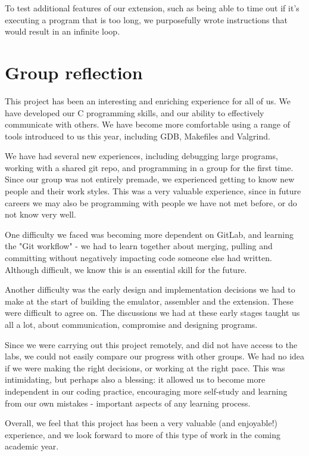 \documentclass[11pt]{article}
\begin{document}
To test additional features of our extension, such as being able to time out if it's executing a program that is too long, we purposefully wrote instructions that would result in an infinite loop. 

\section*{Group reflection}

This project has been an interesting and enriching experience for all of us. We have developed our C programming skills, and our ability to effectively communicate with others. We have become more comfortable using a range of tools introduced to us this year, including GDB, Makefiles and Valgrind. 

We have had several new experiences, including debugging large programs, working with a shared git repo, and programming in a group for the first time. Since our group was not entirely premade, we experienced getting to know new people and their work styles. This was a very valuable experience, since in future careers we may also be programming with people we have not met before, or do not know very well. 

One difficulty we faced was becoming more dependent on GitLab, and learning the "Git workflow" - we had to learn together about merging, pulling and committing without negatively impacting code someone else had written. Although difficult, we know this is an essential skill for the future. 

Another difficulty was the early design and implementation decisions we had to make at the start of building the emulator, assembler and the extension. These were difficult to agree on. The discussions we had at these early stages taught us all a lot, about communication, compromise and designing programs.

Since we were carrying out this project remotely, and did not have access to the labs, we could not easily compare our progress with other groups. We had no idea if we were making the right decisions, or working at the right pace. This was intimidating, but perhaps also a blessing: it allowed us to become more independent in our coding practice, encouraging more self-study and learning from our own mistakes - important aspects of any learning process.

Overall, we feel that this project has been a very valuable (and enjoyable!) experience, and we look forward to more of this type of work in the coming academic year.
\end{document}
